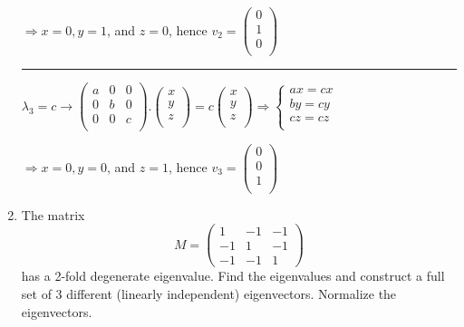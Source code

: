 \documentclass[fleqn]{article}
\begin{document}
\begin{enumerate}
      \textcolor{hwColor}{
        $
        \Longrightarrow 
        x=0, y=1$, and $z=0$, hence $v_2=\begin{pmatrix}
          0 \\
          1 \\
          0 \\
        \end{pmatrix}
        $
      }

      
      \textcolor{hwColor}{
        \rule{16cm}{0.4pt}
      }

      \textcolor{hwColor}{
        $
        \lambda_3=c \rightarrow 
        \begin{pmatrix}
          a & 0 & 0 \\
          0 & b & 0 \\
          0 & 0 & c \\
        \end{pmatrix}.\begin{pmatrix}
          x \\
          y \\
          z \\
        \end{pmatrix}=c\begin{pmatrix}
          x \\
          y \\
          z \\
        \end{pmatrix} 
        \Longrightarrow 
        \begin{cases}
          ax=cx \\
          by=cy \\
          cz=cz \\
        \end{cases}
        $
      }

      \textcolor{hwColor}{
        $
        \Longrightarrow 
        x=0, y=0$, and $z=1$, hence $v_3=\begin{pmatrix}
          0 \\
          0 \\
          1 \\
        \end{pmatrix}
        $
      }

  
    \item The matrix 
      $$M = 
      \begin{pmatrix}
      1 & -1 & -1 \\
      -1 & 1 & -1 \\
      -1 & -1 & 1
      \end{pmatrix}
      $$
      has a 2-fold degenerate eigenvalue. Find the eigenvalues and construct a full set of 3 different
      (linearly independent) eigenvectors. Normalize the eigenvectors.


\end{enumerate}
\end{document}
